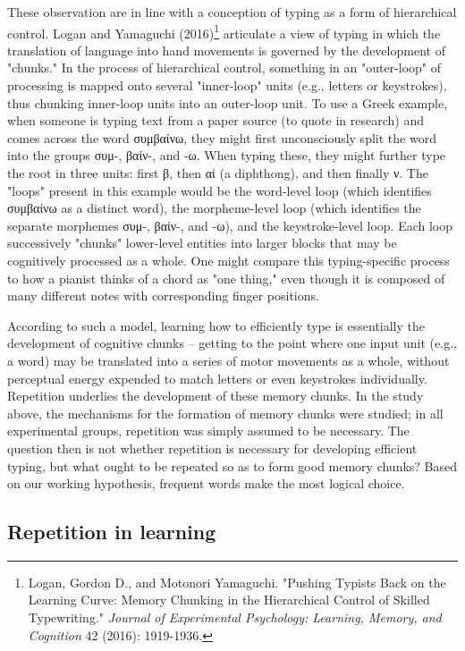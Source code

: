 \documentclass[11pt]{article}
\begin{document}
These observation are in line with a conception of typing as a form of hierarchical control. Logan and Yamaguchi (2016)\footnote{Logan, Gordon D., and Motonori Yamaguchi. "Pushing Typists Back on the Learning Curve: Memory Chunking in the Hierarchical Control of Skilled Typewriting." \emph{Journal of Experimental Psychology: Learning, Memory, and Cognition} 42 (2016): 1919-1936.} articulate a view of typing in which the translation of language into hand movements is governed by the development of "chunks." In the process of hierarchical control, something in an "outer-loop" of processing is mapped onto several "inner-loop" units (e.g., letters or keystrokes), thus chunking inner-loop units into an outer-loop unit. To use a Greek example, when someone is typing text from a paper source (to quote in research) and comes across the word συμβαίνω, they might first unconsciously split the word into the groups συμ-, βαίν-, and -ω. When typing these, they might further type the root in three units: first β, then αί (a diphthong), and then finally ν. The "loops" present in this example would be the word-level loop (which identifies συμβαίνω as a distinct word), the morpheme-level loop (which identifies the separate morphemes συμ-, βαίν-, and -ω), and the keystroke-level loop. Each loop successively "chunks" lower-level entities into larger blocks that may be cognitively processed as a whole. One might compare this typing-specific process to how a pianist thinks of a chord as "one thing," even though it is composed of many different notes with corresponding finger positions.

According to such a model, learning how to efficiently type is essentially the development of cognitive chunks -- getting to the point where one input unit (e.g., a word) may be translated into a series of motor movements as a whole, without perceptual energy expended to match letters or even keystrokes individually. Repetition underlies the development of these memory chunks. In the study above, the mechanisms for the formation of memory chunks were studied; in all experimental groups, repetition was simply assumed to be necessary. The question then is not whether repetition is necessary for developing efficient typing, but what ought to be repeated so as to form good memory chunks? Based on our working hypothesis, frequent words make the most logical choice.

\subsection{Repetition in learning}
\label{sec:org6428c5a}
\end{document}
